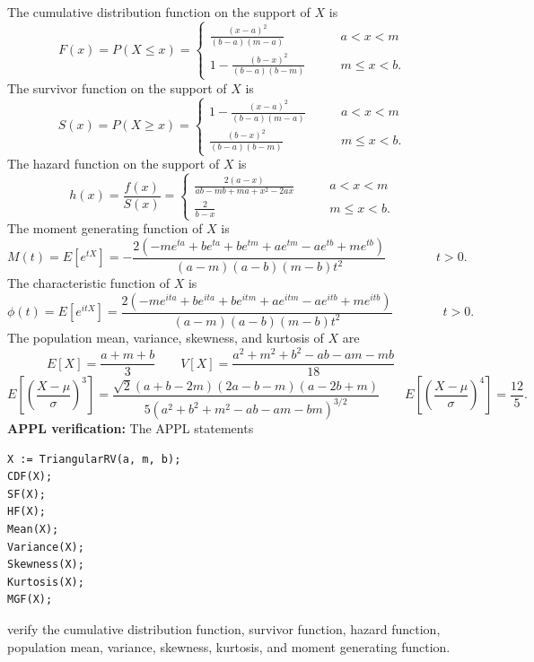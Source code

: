 \documentclass[12pt,fullpage]{article}
\begin{document}
\noindent
The cumulative distribution function on
the support of $X$ is 
$$
F(x) = P(X \le x) = \left\{ \begin{array}{ll}
		\frac{(x - a) ^ 2}{(b - a) (m - a)} & \qquad a < x < m \\ [0.05in]
		1 - \frac{(b - x) ^ 2}{(b - a) (b - m)} & \qquad m \leq x < b.
		\end{array} \right. \, 
$$
The survivor function on the support of $X$ is
$$
S(x) = P(X \ge x) = \left\{ \begin{array}{ll}
		1 - \frac{(x - a) ^ 2}{(b - a) (m - a)} & \qquad a < x < m\\ [0.05in]
		\frac{(b - x) ^ 2}{(b - a) (b - m)} & \qquad m \leq x < b.
		\end{array} \right. \, 
$$
The hazard function on the support of $X$ is
$$
h(x) = \frac{f(x)}{S(x)} = \left\{ \begin{array}{ll}
		\frac{2 (a - x)}{ab - mb + ma + x ^ 2 - 2 ax} & \qquad a < x < m \\ [0.05in]
		\frac{2}{b - x} & \qquad m \leq x < b.
		\end{array} \right. \, 
$$
The moment generating function of $X$ is
$$
M(t) = E\left[ e ^ {tX} \right] = -\frac{2 (- m e ^ {ta} + b e ^ {ta} + b e ^ {tm} + a e ^ {tm} - a e ^ {tb} + m e ^ {tb})} {(a - m) (a - b) (m - b) t ^2} \qquad \qquad  t > 0.
$$
The characteristic function of $X$ is
$$
\phi(t) = E\left[ e ^ {it X} \right] = \frac{2(- m e ^ {it a} + b e ^ {it a} + b e ^ {it m} + a e ^ {it m} - a e ^ {it b} + m e ^ {it b})} {(a - m) (a - b) (m - b)t ^ 2} \qquad \qquad  t > 0.
$$
The population mean, variance, skewness, and kurtosis of $X$ are
$$
E[X] = \frac{a + m + b} {3} \quad \quad 
V[X] = \frac{a ^ 2 + m ^ 2 + b ^ 2 - ab - am - mb} {18} \quad \quad 
$$
$$
E\left[ \left( \frac{X - \mu}{\sigma} \right) ^ 3 \right] =  \frac{\sqrt{2}(a + b - 2m) (2a - b - m) (a - 2b + m)} {5 (a ^ 2 + b ^ 2 + m ^ 2 - ab - am - bm) ^ {3/2}}\quad \quad
E\left[ \left( \frac{X - \mu}{\sigma} \right) ^ 4 \right] = \frac{12}{5}.
$$
\noindent
{\bf APPL verification:}
The APPL statements
\begin{verbatim}
X := TriangularRV(a, m, b);
CDF(X);
SF(X);
HF(X); 
Mean(X);
Variance(X);
Skewness(X);
Kurtosis(X);
MGF(X);
\end{verbatim}
verify the cumulative distribution function, survivor function, hazard function, population mean, variance, skewness, kurtosis, and moment generating function.
\end{document}

